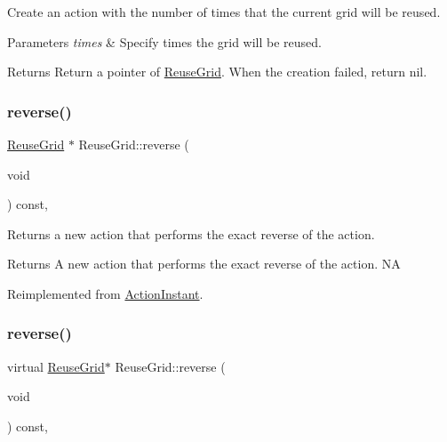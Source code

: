Create an action with the number of times that the current grid will be reused. 


\begin{DoxyParams}{Parameters}
{\em times} & Specify times the grid will be reused. \\
\hline
\end{DoxyParams}
\begin{DoxyReturn}{Returns}
Return a pointer of \hyperlink{classReuseGrid}{Reuse\+Grid}. When the creation failed, return nil. 
\end{DoxyReturn}
\mbox{\label{classReuseGrid_ac5ec66174df4786da1005acbcb9b62a8}} 
\subsubsection{\texorpdfstring{reverse()}{reverse()}\hspace{0.1cm}{\footnotesize\ttfamily [1/2]}}
{\footnotesize\ttfamily \hyperlink{classReuseGrid}{Reuse\+Grid} $\ast$ Reuse\+Grid\+::reverse (\begin{DoxyParamCaption}\item[{void}]{ }\end{DoxyParamCaption}) const\hspace{0.3cm}{\ttfamily [override]}, {\ttfamily [virtual]}}

Returns a new action that performs the exact reverse of the action.

\begin{DoxyReturn}{Returns}
A new action that performs the exact reverse of the action.  NA 
\end{DoxyReturn}


Reimplemented from \hyperlink{classActionInstant_aeb1870802c509e1f4111c863a28e9262}{Action\+Instant}.

\mbox{\label{classReuseGrid_aeabc5f387fb58963ae2682799742a536}} 
\subsubsection{\texorpdfstring{reverse()}{reverse()}\hspace{0.1cm}{\footnotesize\ttfamily [2/2]}}
{\footnotesize\ttfamily virtual \hyperlink{classReuseGrid}{Reuse\+Grid}$\ast$ Reuse\+Grid\+::reverse (\begin{DoxyParamCaption}\item[{void}]{ }\end{DoxyParamCaption}) const\hspace{0.3cm}{\ttfamily [override]}, {\ttfamily [virtual]}}

